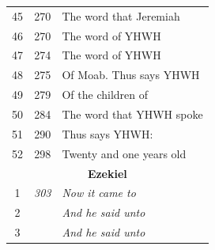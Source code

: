 \documentclass{article}
\newlength{\minipageheight}
\newlength{\minipagewidth}
\begin{document}
\begin{minipage}[r][\minipageheight][t]{\minipagewidth}
\begin{longtable}{ccl}
        45          & 270            & The word that Jeremiah              \\
        46          & 270            & The word of YHWH                    \\
        47          & 274            & The word of YHWH                    \\
        48          & 275            & Of Moab. Thus says YHWH             \\
        49          & 279            & Of the children of                  \\
        50          & 284            & The word that YHWH spoke            \\
        51          & 290            & Thus says YHWH:                     \\ %
        52          & 298            & Twenty and one years old            \\ %

        \multicolumn{3}{c}{\textbf{Ezekiel}}                               \\
        \hline
        1           & \textit{303}   & \textit{Now it came to}             \\
        2           &                & \textit{And he said unto}           \\
        3           &                & \textit{And he said unto}           \\
    \end{longtable}
\end{minipage}%
%
\end{document}
